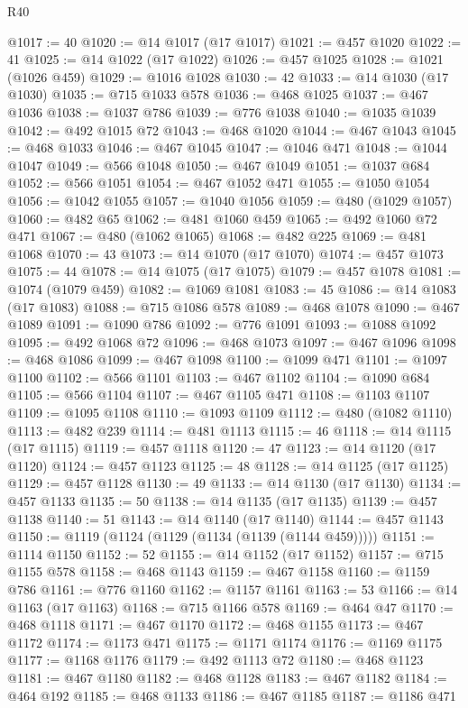 \begin{lexlean}{R40}
\begin{coremodule}
{{{{{{{{{{{{{{{{{{{{{{{{{{{{{{{{{{{{{{{{{{{{{{{{{{{{{{{{{{{{{{{{{{{{{{{{{{{{{{{{{{{{{{{{{{{{{{{{{{{{{{{{{{{{{@1017 := 40
@1020 := @14 @1017 (@17 @1017)
@1021 := @457 @1020
@1022 := 41
@1025 := @14 @1022 (@17 @1022)
@1026 := @457 @1025
@1028 := @1021 (@1026 @459)
@1029 := @1016 @1028
@1030 := 42
@1033 := @14 @1030 (@17 @1030)
@1035 := @715 @1033 @578
@1036 := @468 @1025
@1037 := @467 @1036
@1038 := @1037 @786
@1039 := @776 @1038
@1040 := @1035 @1039
@1042 := @492 @1015 @72
@1043 := @468 @1020
@1044 := @467 @1043
@1045 := @468 @1033
@1046 := @467 @1045
@1047 := @1046 @471
@1048 := @1044 @1047
@1049 := @566 @1048
@1050 := @467 @1049
@1051 := @1037 @684
@1052 := @566 @1051
@1054 := @467 @1052 @471
@1055 := @1050 @1054
@1056 := @1042 @1055
@1057 := @1040 @1056
@1059 := @480 (@1029 @1057)
@1060 := @482 @65
@1062 := @481 @1060 @459
@1065 := @492 @1060 @72 @471
@1067 := @480 (@1062 @1065)
@1068 := @482 @225
@1069 := @481 @1068
@1070 := 43
@1073 := @14 @1070 (@17 @1070)
@1074 := @457 @1073
@1075 := 44
@1078 := @14 @1075 (@17 @1075)
@1079 := @457 @1078
@1081 := @1074 (@1079 @459)
@1082 := @1069 @1081
@1083 := 45
@1086 := @14 @1083 (@17 @1083)
@1088 := @715 @1086 @578
@1089 := @468 @1078
@1090 := @467 @1089
@1091 := @1090 @786
@1092 := @776 @1091
@1093 := @1088 @1092
@1095 := @492 @1068 @72
@1096 := @468 @1073
@1097 := @467 @1096
@1098 := @468 @1086
@1099 := @467 @1098
@1100 := @1099 @471
@1101 := @1097 @1100
@1102 := @566 @1101
@1103 := @467 @1102
@1104 := @1090 @684
@1105 := @566 @1104
@1107 := @467 @1105 @471
@1108 := @1103 @1107
@1109 := @1095 @1108
@1110 := @1093 @1109
@1112 := @480 (@1082 @1110)
@1113 := @482 @239
@1114 := @481 @1113
@1115 := 46
@1118 := @14 @1115 (@17 @1115)
@1119 := @457 @1118
@1120 := 47
@1123 := @14 @1120 (@17 @1120)
@1124 := @457 @1123
@1125 := 48
@1128 := @14 @1125 (@17 @1125)
@1129 := @457 @1128
@1130 := 49
@1133 := @14 @1130 (@17 @1130)
@1134 := @457 @1133
@1135 := 50
@1138 := @14 @1135 (@17 @1135)
@1139 := @457 @1138
@1140 := 51
@1143 := @14 @1140 (@17 @1140)
@1144 := @457 @1143
@1150 := @1119 (@1124 (@1129 (@1134 (@1139 (@1144 @459)))))
@1151 := @1114 @1150
@1152 := 52
@1155 := @14 @1152 (@17 @1152)
@1157 := @715 @1155 @578
@1158 := @468 @1143
@1159 := @467 @1158
@1160 := @1159 @786
@1161 := @776 @1160
@1162 := @1157 @1161
@1163 := 53
@1166 := @14 @1163 (@17 @1163)
@1168 := @715 @1166 @578
@1169 := @464 @47
@1170 := @468 @1118
@1171 := @467 @1170
@1172 := @468 @1155
@1173 := @467 @1172
@1174 := @1173 @471
@1175 := @1171 @1174
@1176 := @1169 @1175
@1177 := @1168 @1176
@1179 := @492 @1113 @72
@1180 := @468 @1123
@1181 := @467 @1180
@1182 := @468 @1128
@1183 := @467 @1182
@1184 := @464 @192
@1185 := @468 @1133
@1186 := @467 @1185
@1187 := @1186 @471
}}}}}}}}}}}}}}}}}}}}}}}}}}}}}}}}}}}}}}}}}}}}}}}}}}}}}}}}}}}}}}}}}}}}}}}}}}}}}}}}}}}}}}}}}}}}}}}}}}}}}}}}}}}}}
\end{coremodule}
\end{lexlean}
